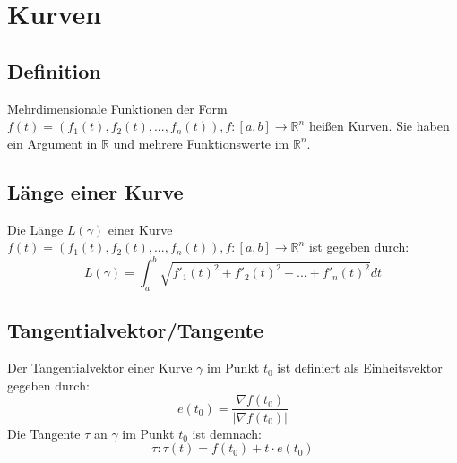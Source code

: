 \section{Kurven} %
\label{sec:kurven}

\subsection{Definition} %
\label{sub:definition}

Mehrdimensionale Funktionen der Form $f(t) = (f_1(t),f_2(t),...,f_n(t)), f:[a,b] \rightarrow \mathbb{R}^n$ heißen Kurven.
Sie haben ein Argument in $\mathbb{R}$ und mehrere Funktionswerte im $\mathbb{R}^n$.

\subsection{Länge einer Kurve} %
\label{sub:länge_einer_kurve}

Die Länge $L(\gamma)$ einer Kurve $f(t) = (f_1(t),f_2(t),...,f_n(t)), f:[a,b] \rightarrow \mathbb{R}^n$ ist gegeben durch:
\begin{equation}
	L(\gamma) = \int_a^b \sqrt{f'_1(t)^2 + f'_2(t)^2 + ... + f'_n(t)^2}dt
\end{equation}

\subsection{Tangentialvektor/Tangente} %
\label{sub:tangentialvektor_tangente}

Der Tangentialvektor einer Kurve $\gamma$ im Punkt $t_0$ ist definiert als Einheitsvektor gegeben durch: 
\begin{equation}
	e(t_0) = \frac{\nabla f(t_0)}{|\nabla f(t_0)|}
\end{equation}
Die Tangente $\tau$ an $\gamma$ im Punkt $t_0$ ist demnach:
\begin{equation}
	\tau : \tau(t) = f(t_0) +  t \cdot e(t_0)
\end{equation}
